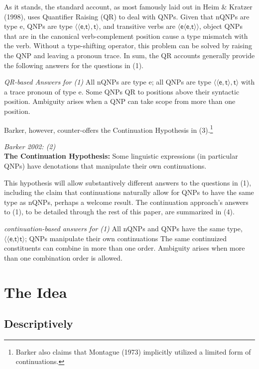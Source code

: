 \documentclass[11pt]{article}
\begin{document}
As it stands, the standard account, as most famously laid out in Heim \& Kratzer (1998), uses Quantifier Raising (QR) to deal with QNPs. Given that nQNPs are type \textsf{e}, QNPs are type $\langle \langle \textsf{e,t} \rangle , \textsf{t} \rangle$, and transitive verbs are $\langle \textsf{e} \langle \textsf{e,t} \rangle \rangle$, object QNPs that are in the canonical verb-complement position cause a type mismatch with the verb. Without a type-shifting operator, this problem can be solved by raising the QNP and leaving a pronoun trace. In sum, the QR accounts generally provide the following answers for the questions in (1).
    
\pex \textit{QR-based Answers for (1)}
\a All nQNPs are type \textsf{e}; all QNPs are type $\langle \langle \textsf{e} , \textsf{t} \rangle , \textsf{t} \rangle$ with a trace pronoun of type \textsf{e}.
\a Some QNPs QR to positions above their syntactic position.
\a Ambiguity arises when a QNP can take scope from more than one position.
\xe
    
Barker, however, counter-offers the Continuation Hypothesis in (3).\footnote{ Barker also claims that Montague (1973) implicitly utilized a limited form of continuations.}
    
\ex \textit{Barker 2002: (2)} \\ \textbf{The Continuation Hypothesis:} Some linguistic expressions (in particular QNPs) have denotations that manipulate their own continuations.
\xe

\noindent This hypothesis will allow substantively different answers to the questions in (1), including the claim that continuations naturally allow for QNPs to have the same type as nQNPs, perhaps a welcome result. The continuation approach's answers to (1), to be detailed through the rest of this paper, are summarized in (4).

\pex \textit{continuation-based answers for (1)}
\a All nQNPs and QNPs have the same type, $\langle \langle \textsf{e,t} \rangle \textsf{t} \rangle$; QNPs manipulate their own continuations
\a The same continuized constituents can combine in more than one order.
\a Ambiguity arises when more than one combination order is allowed.
\xe

\vspace{-1em}
\section{The Idea}

\subsection{Descriptively}
\end{document}
